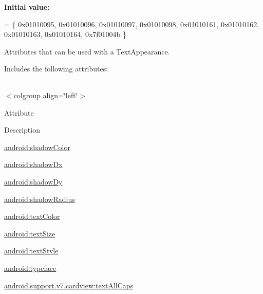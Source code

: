 {\bfseries Initial value\+:}
\begin{DoxyCode}
= \{
            0x01010095, 0x01010096, 0x01010097, 0x01010098,
            0x01010161, 0x01010162, 0x01010163, 0x01010164,
            0x7f01004b
        \}
\end{DoxyCode}
Attributes that can be used with a Text\+Appearance. 

Includes the following attributes\+:

\tabulinesep=1mm
\begin{longtabu} spread 0pt [c]{*{0}{|X[-1]}|}
\hline
\end{longtabu}
$<$colgroup align=\char`\"{}left\char`\"{}$>$ 

Attribute

Description 

{\ttfamily \hyperlink{classandroid_1_1support_1_1v7_1_1cardview_1_1R_1_1styleable_ac30541b7e882b5cbeca1ff294370508f}{android\+:shadow\+Color}}

{\ttfamily \hyperlink{classandroid_1_1support_1_1v7_1_1cardview_1_1R_1_1styleable_af78673669143ecb19f5c6539038cdabd}{android\+:shadow\+Dx}}

{\ttfamily \hyperlink{classandroid_1_1support_1_1v7_1_1cardview_1_1R_1_1styleable_aa8978ddd3e66c4c1da6e6c1ca8143122}{android\+:shadow\+Dy}}

{\ttfamily \hyperlink{classandroid_1_1support_1_1v7_1_1cardview_1_1R_1_1styleable_a0db854c5b0c5d17f58df560fc89ed0c3}{android\+:shadow\+Radius}}

{\ttfamily \hyperlink{classandroid_1_1support_1_1v7_1_1cardview_1_1R_1_1styleable_ab57942af638bda029a3f64c2f23ca03b}{android\+:text\+Color}}

{\ttfamily \hyperlink{classandroid_1_1support_1_1v7_1_1cardview_1_1R_1_1styleable_a9efe0769c1cb5492f1c2b8ff53b75f49}{android\+:text\+Size}}

{\ttfamily \hyperlink{classandroid_1_1support_1_1v7_1_1cardview_1_1R_1_1styleable_a2c5c2ce44fa4c6ed998a5a0580c7e67b}{android\+:text\+Style}}

{\ttfamily \hyperlink{classandroid_1_1support_1_1v7_1_1cardview_1_1R_1_1styleable_a3626f3ceb70d84f1c812ff1954d363f0}{android\+:typeface}}

{\ttfamily \hyperlink{classandroid_1_1support_1_1v7_1_1cardview_1_1R_1_1styleable_abc7c3f256d837bdb4a0b5aee27f448aa}{android.\+support.\+v7.\+cardview\+:text\+All\+Caps}}

